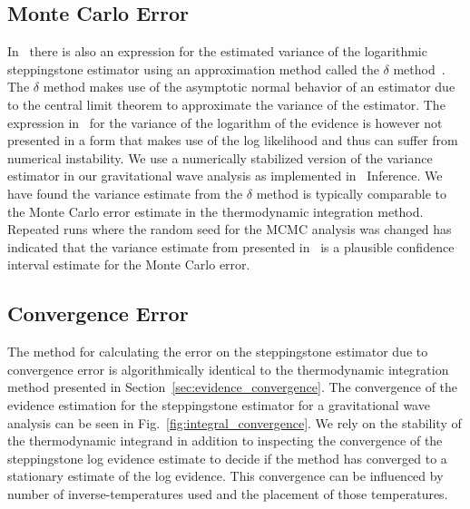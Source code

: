 \subsection{Monte Carlo Error}
In~\cite{xie2010improving} there is also an expression for the estimated variance of the logarithmic steppingstone estimator using an approximation method called the $\delta$ method~\citep{oehlert1992note}. The $\delta$ method makes use of the asymptotic normal behavior of an estimator due to the central limit theorem to approximate the variance of the estimator. The expression in~\cite{xie2010improving} for the variance of the logarithm of the evidence is however not presented in a form that makes use of the log likelihood and thus can suffer from numerical instability. We use a numerically stabilized version of the variance estimator in our gravitational wave analysis as implemented in \pycbc{}\ Inference. We have found the variance estimate from the $\delta$ method is typically comparable to the Monte Carlo error estimate in the thermodynamic integration method. Repeated runs where the random seed for the MCMC analysis was changed has indicated that the variance estimate from presented in~\cite{xie2010improving} is a plausible confidence interval estimate for the Monte Carlo error. 

\subsection{Convergence Error}
The method for calculating the error on the steppingstone estimator due to convergence error is algorithmically identical to the thermodynamic integration method presented in Section~\ref{sec:evidence_convergence}. The convergence of the evidence estimation for the steppingstone estimator for a gravitational wave analysis can be seen in Fig.~\ref{fig:integral_convergence}. We rely on the stability of the thermodynamic integrand in addition to inspecting the convergence of the steppingstone log evidence estimate to decide if the method has converged to a stationary estimate of the log evidence. This convergence can be influenced by number of inverse-temperatures used and the placement of those temperatures.


